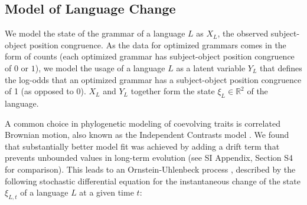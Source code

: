 \documentclass[9pt,twocolumn,twoside,lineno]{pnas-new}
\begin{document}
{\subsection*{Model of Language Change}



We model the state of the grammar of a language $L$ as $X_L$, the observed subject-object position congruence.
As the data for optimized grammars comes in the form of counts (each optimized grammar has subject-object position congruence of $0$ or $1$), we model the usage of a language $L$ as a latent variable $Y_L$ that defines the log-odds that an optimized grammar has a subject-object position congruence of 1 (as opposed to 0).
$X_L$ and $Y_L$ together form the state $\xi_L \in \mathbb{R}^2$  of the language.



A common choice in phylogenetic modeling of coevolving traits is correlated Brownian motion, also known as the Independent Contrasts model \citep{felsenstein1973maximum,freckleton2012fast}.
We found that substantially better model fit was achieved by adding a drift term that prevents unbounded values  in long-term evolution (see SI Appendix, Section S4 for comparison).
This leads to an Ornstein-Uhlenbeck process \citep{felsenstein1988phylogenies,hansen1997stabilizing,blackwell2003bayesian}, described by the following stochastic differential equation for the instantaneous change of the state $\xi_{L,t}$ of a language $L$ at a given time $t$:

}
\end{document}
